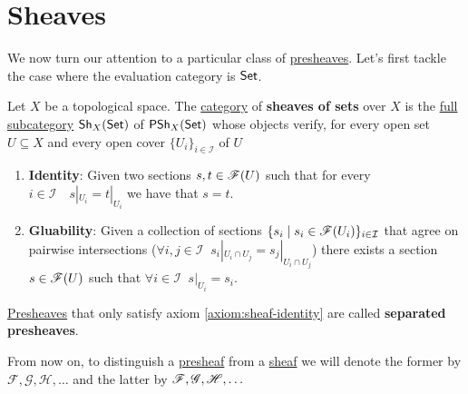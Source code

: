 \documentclass[../../../main]{subfiles}
\begin{document}
\section{Sheaves} \label{sec:sheaves}


We now turn our attention to a particular class of \hyperref[def:presheaf]{presheaves}.
Let's first tackle the case where the evaluation category is \(\mathsf{Set}\).

\begin{definition} \label{def:set-valued-sheaf}
  Let \(X\) be a topological space.
  The \hyperref[def:category]{category} of \textbf{sheaves of sets} over \(X\) is the \hyperref[def:subcategory]{full subcategory} \(\mathsf{Sh}_{X}(\mathsf{Set})\) of \(\mathsf{PSh}_{X}(\mathsf{Set})\) whose objects verify, for every open set \(U \subseteq X\) and every open cover \(\{U_{i}\}_{i \in \mathcal{I}}\) of \(U\)
  \begin{enumerate}[label=SH.\arabic*), ref=SH.\arabic*]
    \item\label{axiom:sheaf-identity} \textbf{Identity}: Given two sections \(s, t \in \mathscr{F}(U)\) such that for every \(i \in \mathcal{I} \quad s|_{U_{i}} = t|_{U_{i}}\) we have that \(s = t\).
    \item\label{axiom:sheaf-gluability} \textbf{Gluability}: Given a collection of sections \(\{s_{i} \mid s_{i} \in \mathscr{F}(U_{i})\}_{i \in \mathcal{I}}\) that agree on pairwise intersections (\(\forall i, j \in \mathcal{I} \;\; s_{i}|_{U_{i} \cap U_{j}} = s_{j}|_{U_{i} \cap U_{j}}\)) there exists a section \(s \in \mathscr{F}(U)\) such that \(\forall i \in \mathcal{I} \;\; s|_{U_{i}} = s_{i}\).
  \end{enumerate}

  \hyperref[def:presheaf]{Presheaves} that only satisfy axiom \ref{axiom:sheaf-identity} are called \textbf{separated presheaves}.
\end{definition}

\begin{notation}
  From now on, to distinguish a \hyperref[def:presheaf]{presheaf} from a \hyperref[def:sheaf]{sheaf} we will denote the former by \(\mathcal{F}, \mathcal{G}, \mathcal{H}, \ldots\) and the latter by \(\mathscr{F}, \mathscr{G}, \mathscr{H}, \ldots\)
\end{notation}
\end{document}
